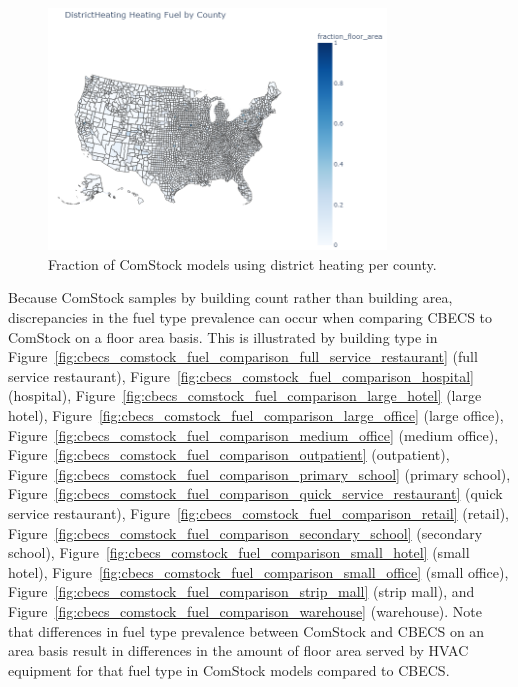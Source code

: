 \begin{figure}
  \centering
  \includegraphics[width=0.8\textwidth]{figures/map_districtheating.png}
  \caption[Fraction of ComStock models using district heating/water heating per county]{Fraction of ComStock models using district heating per county.}
  \label{fig:map_district}
\end{figure}

Because ComStock samples by building count rather than building area, discrepancies in the fuel type prevalence can occur when comparing CBECS to ComStock on a floor area basis. This is illustrated by building type in Figure~\ref{fig:cbecs_comstock_fuel_comparison_full_service_restaurant} (full service restaurant), Figure~\ref{fig:cbecs_comstock_fuel_comparison_hospital} (hospital), Figure~\ref{fig:cbecs_comstock_fuel_comparison_large_hotel} (large hotel), Figure~\ref{fig:cbecs_comstock_fuel_comparison_large_office} (large office), Figure~\ref{fig:cbecs_comstock_fuel_comparison_medium_office} (medium office), Figure~\ref{fig:cbecs_comstock_fuel_comparison_outpatient} (outpatient), Figure~\ref{fig:cbecs_comstock_fuel_comparison_primary_school} (primary school), Figure~\ref{fig:cbecs_comstock_fuel_comparison_quick_service_restaurant} (quick service restaurant), Figure~\ref{fig:cbecs_comstock_fuel_comparison_retail} (retail), Figure~\ref{fig:cbecs_comstock_fuel_comparison_secondary_school} (secondary school), Figure~\ref{fig:cbecs_comstock_fuel_comparison_small_hotel} (small hotel), Figure~\ref{fig:cbecs_comstock_fuel_comparison_small_office} (small office), Figure~\ref{fig:cbecs_comstock_fuel_comparison_strip_mall} (strip mall), and Figure~\ref{fig:cbecs_comstock_fuel_comparison_warehouse} (warehouse). Note that differences in fuel type prevalence between ComStock and CBECS on an area basis result in differences in the amount of floor area served by HVAC equipment for that fuel type in ComStock models compared to CBECS.   

